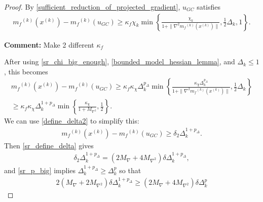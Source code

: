 \documentclass{article}
\newenvironment{comment}
  {\par\medskip
   \color{red}%
   \begin{framed}
   \textbf{Comment: }\ignorespaces}
 {\end{framed}
  \medskip}
\theoremstyle{case}
\numberwithin{theorem}{subsection}
\newcommand{\dk}{\Delta_k}
\newcommand{\maxgrad}{{M_{\nabla}}}
\newcommand{\maxhessian}{{M_{\nabla^2}}}
\newcommand{\mfk}{{{m}_f}^{(k)}}
\newcommand{\xk}{x^{(k)}}
\begin{document}
\begin{proof}
By \cref{sufficient_reduction_of_projected_gradient}, $u_{GC}$ satisfies
\begin{align*}
\mfk(\xk) - \mfk(u_{GC}) \ge \kappa_f \chi_k \min\left\{ \frac{\chi_k}{1+\|\nabla^2 \mfk(\xk)\|}, \frac 1 2 \dk, 1 \right\}.
\end{align*}


\begin{comment}
Make 2 different $\kappa_f$
\end{comment}

After using \cref{sr_chi_big_enough}, \cref{bounded_model_hessian_lemma}, and $\dk \le 1$, this becomes
\begin{align*}
\mfk(\xk) - \mfk(u_{GC})
\ge \kappa_f \kappa_{\chi} \dk^{p_{\Delta}} \min\left\{ \frac{\kappa_{\chi} \dk^{p_{\Delta}}}{1+\|\nabla^2 \mfk(\xk)\|}, \frac 1 2 \dk \right\} \\
\ge \kappa_f \kappa_{\chi} \dk^{1 + p_{\Delta}} \min\left\{ \frac{\kappa_{\chi}}{1 + \maxhessian}, \frac 1 2  \right\}.
\end{align*}
We can use \cref{define_delta2} to simplify this:
\begin{align*}
\mfk(\xk) - \mfk(u_{GC}) \ge \delta_2 \dk^{1 + p_{\Delta}}.
\end{align*}
Then \cref{sr_define_delta} gives
\begin{align*}
\delta_2 \dk^{1 + p_{\Delta}} = \left(2\maxgrad + 4\maxhessian\right)\delta\dk^{1 + p_{\Delta}},
\end{align*}
and \cref{sr_p_big} implies $\dk^{1+p_{\Delta}} \ge \dk^p$ so that
\begin{align*}
2\left(\maxgrad + 2\maxhessian\right)\delta\dk^{1 + p_{\Delta}}
\ge \left(2\maxgrad + 4\maxhessian\right)\delta\dk^{p}
\end{align*}



\end{proof}
\end{document}
